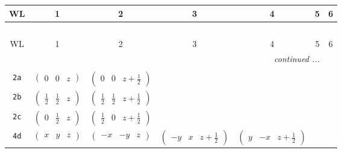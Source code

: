 \documentclass[fleqn,9pt,landscape]{jsarticle}
\begin{document}
\begin{center}
\renewcommand{\arraystretch}{1.2}
\begin{longtable}{ccccccc}
 \hline \hline
WL & 1 & 2 & 3 & 4 & 5 & 6 \\ \hline \endfirsthead

\multicolumn{6}{l}{\tablename\ \thetable{}} \\
 \hline \hline
WL & 1 & 2 & 3 & 4 & 5 & 6 \\ \hline \endhead

 \hline \hline
\multicolumn{6}{r}{\footnotesize\it continued ...} \\ \endfoot

 \hline \hline
\multicolumn{6}{r}{} \\ \endlastfoot

{\tt 2a} & $ \begin{pmatrix} 0 & 0 & z \end{pmatrix} $ & $ \begin{pmatrix} 0 & 0 & z + \frac{1}{2} \end{pmatrix} $ & $  $ & $  $ \\ \hline
{\tt 2b} & $ \begin{pmatrix} \frac{1}{2} & \frac{1}{2} & z \end{pmatrix} $ & $ \begin{pmatrix} \frac{1}{2} & \frac{1}{2} & z + \frac{1}{2} \end{pmatrix} $ & $  $ & $  $ \\ \hline
{\tt 2c} & $ \begin{pmatrix} 0 & \frac{1}{2} & z \end{pmatrix} $ & $ \begin{pmatrix} \frac{1}{2} & 0 & z + \frac{1}{2} \end{pmatrix} $ & $  $ & $  $ \\ \hline
{\tt 4d} & $ \begin{pmatrix} x & y & z \end{pmatrix} $ & $ \begin{pmatrix} - x & - y & z \end{pmatrix} $ & $ \begin{pmatrix} - y & x & z + \frac{1}{2} \end{pmatrix} $ & $ \begin{pmatrix} y & - x & z + \frac{1}{2} \end{pmatrix} $ \\
\end{longtable}
\end{center}
\end{document}
